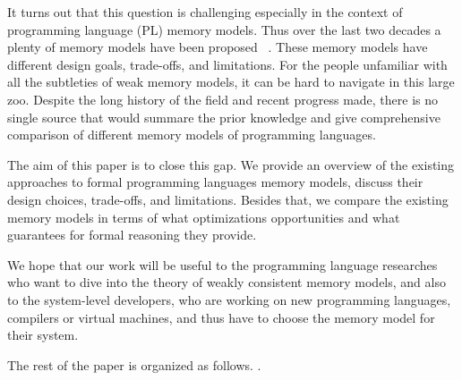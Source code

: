 It turns out that this question is challenging
especially in the context of programming language (PL) memory models.
Thus over the last two decades a plenty of memory models have been proposed~%
\cite{Manson-al:POPL05, Batty-al:POPL11, Batty-el:POPL16, 
Dolan-al:PLDI18, Watt-el:OOPSLA19, Watt-el:PLDI2020, 
Jeffrey-Riely:LICS16, PichonPharabod-Sewell:POPL16, 
Podkopaev-al:CoRR16, Kang-al:POPL17, Chakraborty-Vafeiadis:POPL19, 
Paviotti-el:ESOP20, Lee-el:PLDI20}. 
These memory models have different design goals, trade-offs, and limitations.
For the people unfamiliar with all the subtleties 
of weak memory models, it can be hard to navigate in this large zoo.
Despite the long history of the field and recent progress made, 
there is no single source that would summare the prior knowledge
and give comprehensive comparison of different memory models
of programming languages.

The aim of this paper is to close this gap.
We provide an overview of the existing approaches to 
formal programming languages memory models,
discuss their design choices, trade-offs, and limitations.
Besides that, we compare the existing memory models 
in terms of what optimizations opportunities 
and what guarantees for formal reasoning they provide.

We hope that our work will be useful to the programming language researches 
who want to dive into the theory of weakly consistent memory models,
and also to the system-level developers, 
who are working on new programming languages, compilers or virtual machines, 
and thus have to choose the memory model for their system.

The rest of the paper is organized as follows.
\todo{}.
